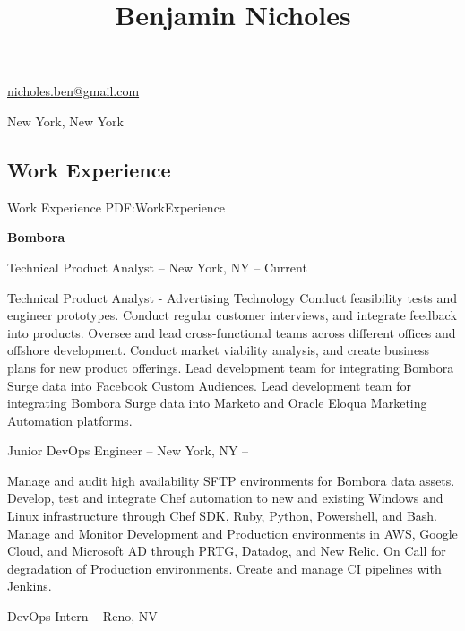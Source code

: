\documentclass[a4paper,10pt,oneside]{article}
\begin{document}
\thispagestyle{empty}


\title{Benjamin Nicholes}

\begin{subtitle}
\href{mailto:nicholes.ben@gmail.com}
{nicholes.ben@gmail.com}
\par
{New York, New York}
\end{subtitle}

\begin{body}


\section
{Work Experience}
{Work Experience}
{PDF:WorkExperience}

{\textbf{Bombora}}
\par
Technical Product Analyst -- New York, NY
\hfill
{} -- Current
\begin{detail}
\BulletItem
Technical Product Analyst - Advertising Technology
\BulletItem
Conduct feasibility tests and engineer prototypes.
\BulletItem
Conduct regular customer interviews, and integrate feedback into products.
\BulletItem
Oversee and lead cross-functional teams across different offices and offshore development.
\BulletItem
Conduct market viability analysis, and create business plans for new product offerings.
\BulletItem
Lead development team for integrating Bombora Surge data into Facebook Custom Audiences.
\BulletItem
Lead development team for integrating Bombora Surge data into Marketo \newline and Oracle Eloqua Marketing Automation platforms.

\end{detail}

Junior DevOps Engineer -- New York, NY
\hfill
{} -- 
\begin{detail}
\BulletItem
Manage and audit high availability SFTP environments for Bombora data assets.
\BulletItem
Develop, test and integrate Chef automation to new and existing Windows and Linux \newline infrastructure through Chef SDK, Ruby, Python, Powershell, and Bash.
\BulletItem
 Manage and Monitor Development and Production environments in AWS, Google Cloud, \newline and Microsoft AD through PRTG, Datadog, and New Relic.
\BulletItem On Call for degradation of Production environments.
 \BulletItem
 Create and manage CI pipelines with Jenkins.
\end{detail}
\par
DevOps Intern -- Reno, NV
\hfill
{} --  
\begin{detail}
\end{detail}


\end{body}
\end{document}
